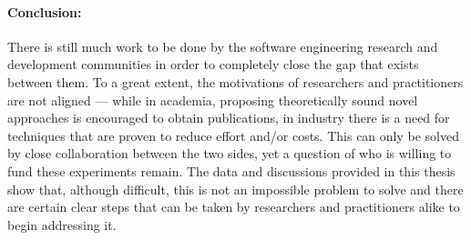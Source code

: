 \documentclass[11pt, a4paper, twoside]{Thesis} %
\begin{document}
\paragraph{Conclusion:}
There is still much work to be done by the software engineering research and development communities in order to completely close the gap that exists between them.
To a great extent, the motivations of researchers and practitioners are not aligned --- while in academia, proposing theoretically sound novel approaches is encouraged to obtain publications, in industry there is a need for techniques that are proven to reduce effort and/or costs.
This can only be solved by close collaboration between the two sides, yet a question of who is willing to fund these experiments remain.
The data and discussions provided in this thesis show that, although difficult, this is not an impossible problem to solve and there are certain clear steps that can be taken by researchers and practitioners alike to begin addressing it.


\cleardoublepage %



\pagestyle{empty} %

\end{document}

